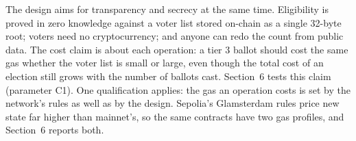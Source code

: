 The design aims for transparency and secrecy at the same time. Eligibility is
proved in zero knowledge against a voter list stored on-chain as a single
32-byte root; voters need no cryptocurrency; and anyone can redo the count from
public data. The cost claim is about each operation: a tier 3 ballot should cost
the same gas whether the voter list is small or large, even though the total
cost of an election still grows with the number of ballots cast. Section~6
tests this claim (parameter C1). One qualification applies: the gas an
operation costs is set by the network's rules as well as by the design.
Sepolia's Glamsterdam rules price new state far higher than mainnet's, so the
same contracts have two gas profiles, and Section~6 reports both.
